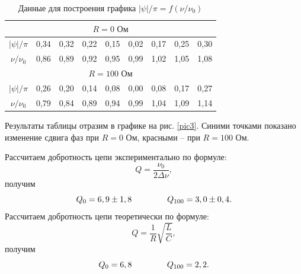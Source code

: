 \documentclass[a4paper, 12pt]{article}
\begin{document}
    \begin{table}[ht]
        \centering
        \begin{tabular}{|c|c|c|c|c|c|c|c|c|}
            \hline
            \multicolumn{9}{|c|}{$R = 0 \text{ Ом}$} \\
            \hline
            $|\psi| / \pi$ & 0,34 & 0,32 & 0,22 & 0,15 & 0,02 & 0,17 & 0,25 & 0,30 \\
            \hline
            $\nu / \nu_0$ & 0,86 & 0,89 & 0,92 & 0,95 & 0,99 & 1,02 & 1,05 & 1,08 \\
            \hline
            \multicolumn{9}{|c|}{$R = 100 \text{ Ом}$} \\
            \hline
            $|\psi| / \pi$ & 0,26 & 0,20 & 0,14 & 0,08 & 0,00 & 0,08 & 0,17 & 0,27 \\
            \hline
            $\nu / \nu_0$ & 0,79 & 0,84 & 0,89 & 0,94 & 0,99 & 1,04 & 1,09 & 1,14 \\
            \hline
        \end{tabular}
        \caption{Данные для построения графика $|\psi| / \pi = f(\nu / \nu_0)$}
    \end{table}
    
    Результаты таблицы отразим в графике на рис. \ref{pic3}. Синими точками показано изменение сдвига фаз при $R = 0 \text{ Ом}$, красными – при $R = 100 \text{ Ом}$.
    
    Рассчитаем добротность цепи экспериментально по формуле:
    \begin{equation}
        Q = \frac{\nu_0}{2 \Delta \nu},
    \end{equation}
    получим
    \begin{equation}
        Q_0 = 6,9 \pm 1,8 \hspace{1.5cm} Q_{100} = 3,0 \pm 0,4.
    \end{equation}
    Рассчитаем добротность цепи теоретически по формуле:
    \begin{equation}
        Q = \frac{1}{R} \sqrt{\frac{L}{C}},
    \end{equation}
    получим
    \begin{equation}
        Q_0 = 6,8 \hspace{1.5cm} Q_{100} = 2,2.
    \end{equation}
    
\end{document}

